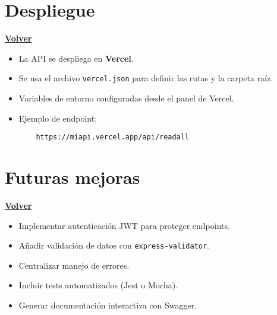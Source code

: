 \documentclass[a4paper,12pt]{article}
\begin{document}
\clearpage

\section{Despliegue}
\hyperlink{anchor-indice}{\textbf{Volver}}\\

\begin{itemize}
    \item La API se despliega en \textbf{Vercel}.
    \item Se usa el archivo \texttt{vercel.json} para definir las rutas y la carpeta raíz.
    \item Variables de entorno configuradas desde el panel de Vercel.
    \item Ejemplo de endpoint:
    \begin{verbatim}
    https://miapi.vercel.app/api/readall
    \end{verbatim}
\end{itemize}

\clearpage

\section{Futuras mejoras}
\hyperlink{anchor-indice}{\textbf{Volver}}\\

\begin{itemize}
    \item Implementar autenticación JWT para proteger endpoints.
    \item Añadir validación de datos con \texttt{express-validator}.
    \item Centralizar manejo de errores.
    \item Incluir tests automatizados (Jest o Mocha).
    \item Generar documentación interactiva con Swagger.
\end{itemize}

\clearpage
\end{document}
